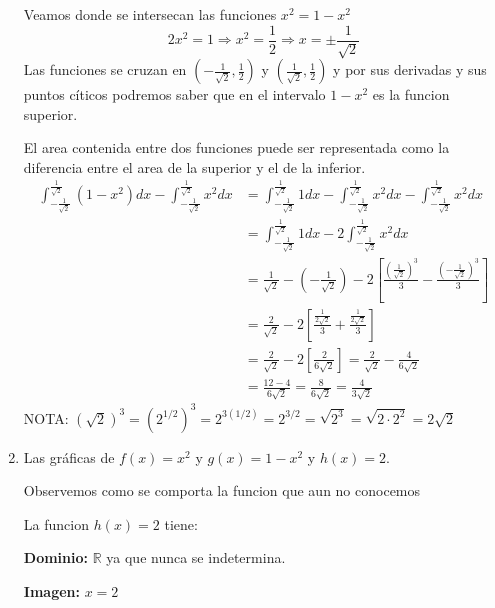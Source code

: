 \documentclass[12pt]{article}
\begin{document}
\begin{enumerate}[\hspace{9px} a)]
        Veamos donde se intersecan las funciones \(x^2=1-x^2\) 
        \[2x^2=1\Rightarrow x^2=\displaystyle\frac{1}{2}\Rightarrow x=\pm\displaystyle\frac{1}{\sqrt{2}}\]
        Las funciones se cruzan en \(\left(-\frac{1}{\sqrt{2}},\displaystyle\frac{1}{2}\right)\) y \(\left(\frac{1}{\sqrt{2}},\displaystyle\frac{1}{2}\right)\) y por sus derivadas y sus puntos c\'iticos podremos saber que en el intervalo \(1-x^2\) es la funcion superior.\medskip

        El area contenida entre dos funciones puede ser representada como la diferencia entre el area de la superior y el de la inferior.\medskip
        \begin{align*}
            \int_{-\frac{1}{\sqrt{2}}}^{\frac{1}{\sqrt{2}}}(1-x^2)dx - \int_{-\frac{1}{\sqrt{2}}}^{\frac{1}{\sqrt{2}}} x^2dx &= \int_{-\frac{1}{\sqrt{2}}}^{\frac{1}{\sqrt{2}}} 1dx - \int_{-\frac{1}{\sqrt{2}}}^{\frac{1}{\sqrt{2}}} x^2dx - \int_{-\frac{1}{\sqrt{2}}}^{\frac{1}{\sqrt{2}}} x^2dx\\
            &= \int_{-\frac{1}{\sqrt{2}}}^{\frac{1}{\sqrt{2}}} 1dx - 2\int_{-\frac{1}{\sqrt{2}}}^{\frac{1}{\sqrt{2}}} x^2dx\\
            &= \frac{1}{\sqrt{2}}-\left(-\frac{1}{\sqrt{2}}\right) - 2\left[\frac{\left(\frac{1}{\sqrt{2}}\right)^3}{3}-\frac{\left(-\frac{1}{\sqrt{2}}\right)^3}{3}\right]\\
            &= \frac{2}{\sqrt{2}} - 2\left[\frac{\frac{1}{2\sqrt{2}}}{3}+\frac{\frac{1}{2\sqrt{2}}}{3}\right]\\
            &= \frac{2}{\sqrt{2}} - 2\left[\frac{2}{6\sqrt{2}}\right] = \frac{2}{\sqrt{2}} - \frac{4}{6\sqrt{2}}\\
            &= \frac{12-4}{6\sqrt{2}} = \frac{8}{6\sqrt{2}} = \frac{4}{3\sqrt{2}}
        \end{align*}
        NOTA: \((\sqrt{2})^3 = (2^{1/2})^3 = 2^{3(1/2)} = 2^{3/2} = \sqrt{2^3} = \sqrt{2\cdot2^2} = 2\sqrt{2}\)\medskip

    \item Las gr\'aficas de \(f(x)=x^2\) y \(g(x)=1-x^2\) y \(h(x)=2\).\medskip
    
        Observemos como se comporta la funcion que aun no conocemos\medskip

        La funcion \(h(x)=2\) tiene:\bigskip

        \textbf{Dominio: }\(\mathbb{R}\) ya que nunca se indetermina.\medskip
        
        \textbf{Imagen: } \(x=2\)\medskip


\end{enumerate}
\end{document}
